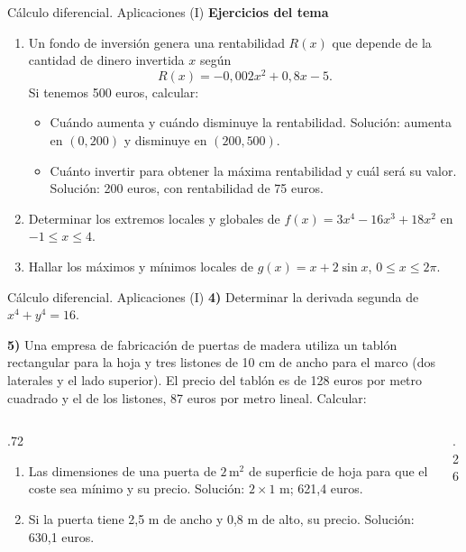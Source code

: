 \documentclass[original_version/main.tex]{subfiles}
\begin{document}
\begin{frame}{Cálculo diferencial. Aplicaciones (I)}
\footnotesize\textbf{Ejercicios del tema}
\begin{enumerate}
\item Un fondo de inversión genera una rentabilidad $R(x)$ que depende de la cantidad de dinero invertida $x$ según
\[R(x)=-0{,}002x^2+0{,}8x-5.\]
Si tenemos 500 euros, calcular:
\begin{itemize}
\item Cuándo aumenta y cuándo disminuye la rentabilidad. Solución: aumenta en $(0,200)$ y disminuye en $(200,500)$.
\item Cuánto invertir para obtener la máxima rentabilidad y cuál será su valor. Solución: 200 euros, con rentabilidad de 75 euros.
\end{itemize}
\item Determinar los extremos locales y globales de $f(x)=3x^4-16x^3+18x^2$ en $-1\le x\le4$.
\item Hallar los máximos y mínimos locales de $g(x)=x+2\sin x$, $0\le x\le2\pi$.
\end{enumerate}
\end{frame}
\begin{frame}{Cálculo diferencial. Aplicaciones (I)}
\footnotesize
\textbf{4)} Determinar la derivada segunda de $x^4+y^4=16$.
\medskip

\textbf{5)} Una empresa de fabricación de puertas de madera utiliza un tablón rectangular para la hoja y tres listones de 10 cm de ancho para el marco (dos laterales y el lado superior). El precio del tablón es de 128 euros por metro cuadrado y el de los listones, 87 euros por metro lineal. Calcular:
\begin{columns}[c]
\begin{column}{.72\textwidth}
\begin{enumerate}
\item Las dimensiones de una puerta de $2\,\mathrm{m}^2$ de superficie de hoja para que el coste sea mínimo y su precio. Solución: $2\times1$ m; 621,4 euros.
\item Si la puerta tiene 2,5 m de ancho y 0,8 m de alto, su precio. Solución: 630,1 euros.
\end{enumerate}
\end{column}
\begin{column}{.26\textwidth}\end{column}
\end{columns}
\end{frame}
\end{document}
